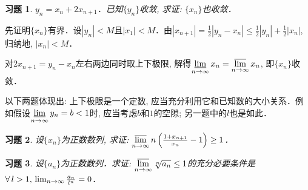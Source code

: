 \documentclass[11pt,a4paper]{ctexart}
\makeatletter
\theoremstyle{thmseries} %
\newtheorem{thm}{定理}[section]
\theoremstyle{exerseries}
\newtheorem{exer}{习题}[section]
\renewenvironment{proof}[1][\proofname]{\par
  \pushQED{\qed}%
  \normalfont \topsep6\p@\@plus6\p@\relax
  \trivlist
  \item[\hskip\labelsep
        \itshape
    #1\@addpunct{}]\ignorespaces
}{%
  \popQED\endtrivlist\@endpefalse
}
\newenvironment{pf}{\begin{proof}[\bfseries\upshape 证\quad]}{\end{proof}}
\newcommand{\bra}[1]{\mathopen{}\left(#1\right)}
\newcommand{\cbra}[1]{\mathopen{}\left\{#1\right\}}
\renewcommand{\epsilon}{\varepsilon}
\newcommand{\R}{\mathbb{R}}
\newcommand{\N}{\mathbb{N}}
\def \nti {\mathnormal{n}\to\infty}
\DeclareMathOperator{\llim}{\underset{\nti}{\underline{\lim}}}
\DeclareMathOperator{\ulim}{\underset{\nti}{\overline{\lim}}}
\makeatother
\begin{document}

\begin{exer}
	$y_n=x_n+2x_{n+1}$．已知$\{y_n\}$收敛, 求证: $\{x_n\}$也收敛．
\end{exer}
\begin{pf}
	先证明$\{x_n\}$有界．设$|y_n|<M$且$|x_1|<M$．由$|x_{n+1}|=\frac{1}{2}|y_n-x_n|\leq\frac{1}{2}|y_n|+\frac{1}{2}|x_n|$, 归纳地, $|x_n|<M$．

	对$2x_{n+1}=y_n-x_n$左右两边同时取上下极限, 解得$\llim x_n=\ulim x_n$, 即$\{x_n\}$收敛．
\end{pf}


以下两题体现出: 上下极限是一个定数, 应当充分利用它和已知数的大小关系．例如假设$\llim y_n=b<1$时, 应当考虑$b$和$1$的空隙; 另一题中的$l$也是如此．
\begin{exer}
	设$\{x_n\}$为正数数列, 求证: $\ulim n\,\bra{\frac{1+x_{n+1}}{x_n}-1}\geq1$．
\end{exer}

\begin{exer}
	设$\{a_n\}$为正数数列．求证: $\ulim \sqrt[n]{a_n}\leq1$的充分必要条件是$\forall\,l>1,\,\lim_{\nti}\frac{a_n}{l^n}=0$．
\end{exer}
\end{document}
